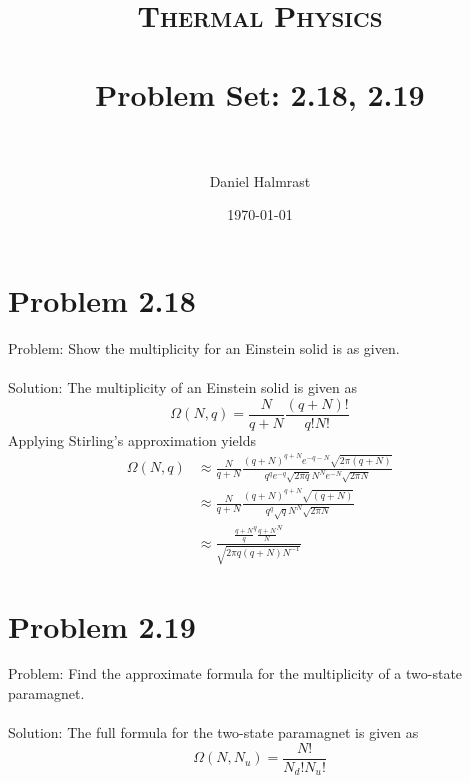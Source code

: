 \documentclass[paper=a4, fontsize=11pt]{scrartcl} %
\title{	
\normalfont \normalsize 
\textsc{Thermal Physics} \\ [25pt] %
\horrule{0.5pt} \\[0.4cm] %
\huge Problem Set: 2.18, 2.19 \\ %
\horrule{2pt} \\[0.5cm] %
}
\author{Daniel Halmrast} %
\date{\normalsize\today} %
\numberwithin{equation}{section} %
\numberwithin{figure}{section} %
\numberwithin{table}{section} %
\begin{document}
\maketitle %


\section*{Problem 2.18}

Problem: Show the multiplicity for an Einstein solid is as given.
\\
\\
Solution:
The multiplicity of an Einstein solid is given as
\[
    \Omega(N,q) = \frac{N}{q+N}\frac{(q+N)!}{q!N!}
\]
Applying Stirling's approximation yields
\begin{equation}
    \begin{aligned}
        \Omega(N,q) &\approx \frac{N}{q+N} \frac{(q+N)^{q+N}e^{-q-N}\sqrt{2\pi(q+N)}}{q^qe^{-q}\sqrt{2\pi q}N^Ne^{-N}\sqrt{2\pi N}}\\
                    &\approx \frac{N}{q+N} \frac{(q+N)^{q+N}\sqrt{(q+N)}}{q^q\sqrt{q}N^N\sqrt{2\pi N}}\\
                    &\approx \frac{\frac{q+N}{q}^q \frac{q+N}{N}^N}{\sqrt{2\pi q (q+N) N^{-1}}}
    \end{aligned}
\end{equation}





\section*{Problem 2.19}
Problem: Find the approximate formula for the multiplicity of a two-state paramagnet.
\\
\\
Solution:
The full formula for the two-state paramagnet is given as
\begin{equation} \label{eq:1}
    \Omega(N, N_u) = \frac{N!}{N_d!N_u!}
\end{equation}
\end{document}
